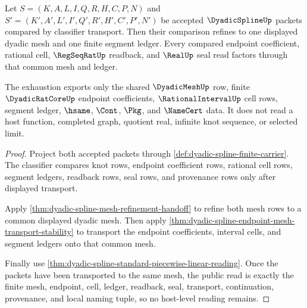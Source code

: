 \begin{theorem}
\label{thm:dyadic-spline-common-refinement-segment-exhaustion}
Let $S=(K,A,L,I,Q,R,H,C,P,N)$ and $S'=(K',A',L',I',Q',R',H',C',P',N')$ be accepted $\DyadicSplineUp$ packets compared by classifier transport. Then their comparison refines to one displayed dyadic mesh and one finite segment ledger. Every compared endpoint coefficient, rational cell, $\RegSeqRatUp$ readback, and $\RealUp$ seal read factors through that common mesh and ledger.

The exhaustion exports only the shared $\DyadicMeshUp$ row, finite $\DyadicRatCoreUp$ endpoint coefficients, $\RationalIntervalUp$ cell rows, segment ledger, $\hsame$, $\Cont$, $\Pkg$, and $\NameCert$ data. It does not read a host function, completed graph, quotient real, infinite knot sequence, or selected limit.
\end{theorem}
\begin{proof}
Project both accepted packets through \autoref{def:dyadic-spline-finite-carrier}. The classifier compares knot rows, endpoint coefficient rows, rational cell rows, segment ledgers, readback rows, seal rows, and provenance rows only after displayed transport.

Apply \autoref{thm:dyadic-spline-mesh-refinement-handoff} to refine both mesh rows to a common displayed dyadic mesh. Then apply \autoref{thm:dyadic-spline-endpoint-mesh-transport-stability} to transport the endpoint coefficients, interval cells, and segment ledgers onto that common mesh.

Finally use \autoref{thm:dyadic-spline-standard-piecewise-linear-reading}. Once the packets have been transported to the same mesh, the public read is exactly the finite mesh, endpoint, cell, ledger, readback, seal, transport, continuation, provenance, and local naming tuple, so no host-level reading remains.
\end{proof}

